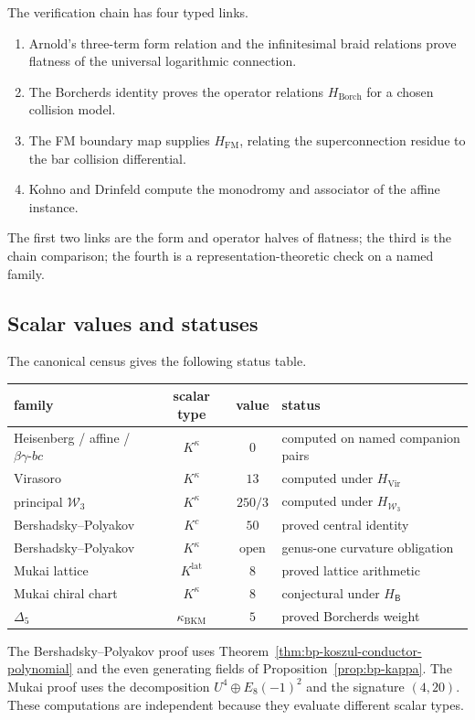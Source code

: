 The verification chain has four typed links.
\begin{enumerate}
\item Arnold's three-term form relation and the infinitesimal braid
relations prove flatness of the universal logarithmic connection.
\item The Borcherds identity proves the operator relations
\(H_{\mathrm{Borch}}\) for a chosen collision model.
\item The FM boundary map supplies \(H_{\mathrm{FM}}\), relating the
superconnection residue to the bar collision differential.
\item Kohno and Drinfeld compute the monodromy and associator of the
affine instance.
\end{enumerate}
The first two links are the form and operator halves of flatness; the
third is the chain comparison; the fourth is a representation-theoretic
check on a named family.

\subsection{Scalar values and statuses}
\label{ssec:climax-platonic-iv-G3}

The canonical census gives the following status table.
\begin{center}
\begin{tabular}{l|c|c|l}
family & scalar type & value & status \\ \hline
Heisenberg / affine / \(\beta\gamma\)-\(bc\)
 & \(K^\kappa\) & \(0\) & computed on named companion pairs \\
Virasoro & \(K^\kappa\) & \(13\) & computed under \(H_{\mathrm{Vir}}\) \\
principal \(\mathcal W_3\)
 & \(K^\kappa\) & \(250/3\) & computed under \(H_{\mathcal W_3}\) \\
Bershadsky--Polyakov & \(K^c\) & \(50\) & proved central identity \\
Bershadsky--Polyakov & \(K^\kappa\) & \(\mathrm{open}\)
 & genus-one curvature obligation \\
Mukai lattice & \(K^{\mathrm{lat}}\) & \(8\) & proved lattice arithmetic \\
Mukai chiral chart & \(K^\kappa\) & \(8\)
 & conjectural under \(H_{\mathsf B}\) \\
\(\Delta_5\) & \(\kappa_{\mathrm{BKM}}\) & \(5\)
 & proved Borcherds weight
\end{tabular}
\end{center}
The Bershadsky--Polyakov proof uses
Theorem~\ref{thm:bp-koszul-conductor-polynomial} and the even
generating fields of Proposition~\ref{prop:bp-kappa}.  The Mukai proof
uses the decomposition
\(U^4\oplus E_8(-1)^2\) and the signature \((4,20)\).  These
computations are independent because they evaluate different scalar
types.

